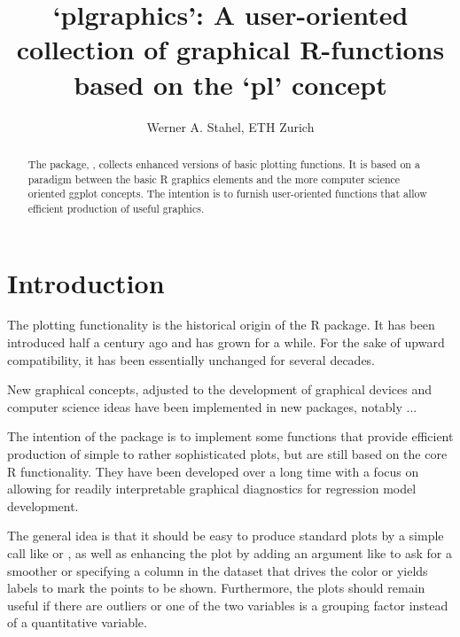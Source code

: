 \documentclass[11pt]{article}\usepackage[]{graphicx}\usepackage[]{color}
\begin{document}
\baselineskip 15pt
\parskip 10pt

\title{\vspace*{-10mm}
`plgraphics': A user-oriented collection of graphical R-functions based on
 the `pl' concept}
\author{Werner A. Stahel, ETH Zurich}
\maketitle

\begin{abstract}\noindent
The package, , collects enhanced versions of basic plotting
functions. It is based on a paradigm between the basic R graphics elements
and the more computer science oriented ggplot concepts.
The intention is to furnish user-oriented functions that allow efficient
production of useful graphics.
\end{abstract}



\tableofcontents

\pagebreak
\section{Introduction}

The plotting functionality is the historical origin of the R package.
It has been introduced half a century ago and has grown for a while.
For the sake of upward compatibility, it has been essentially unchanged for
several decades. 

New graphical concepts, adjusted to the development of graphical devices
and computer science ideas have been implemented in new packages, 
notably  ...

The intention of the package  is to implement some functions
that provide efficient production of simple to rather sophisticated plots,
but are still based on the core R functionality.
They have been developed over a long time with a focus on allowing 
for readily interpretable graphical diagnostics for regression model
development. 

The general idea is that it should be easy to produce standard plots 
by a simple call like  or , 
as well as enhancing the plot by adding an argument like  
to ask for a smoother or specifying 
a column in the dataset that drives the color or yields labels to mark the
points to be shown. 
Furthermore, the plots should remain useful if there are outliers 
or one of the two
variables is a grouping factor instead of a quantitative variable.
\end{document}
